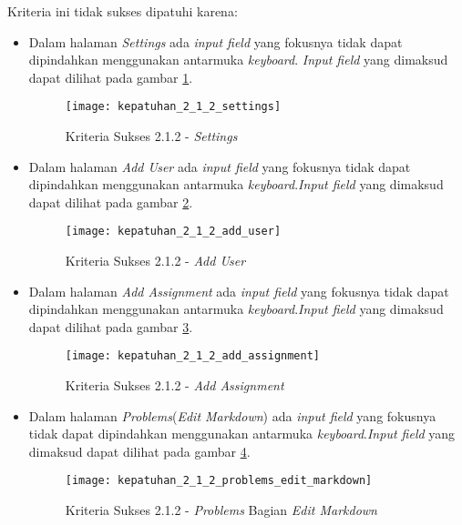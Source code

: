 Kriteria ini tidak sukses dipatuhi karena:
\begin{itemize}
	\item Dalam halaman \textit{Settings} ada \textit{input field} yang fokusnya tidak dapat dipindahkan menggunakan antarmuka \textit{keyboard}. \textit{Input field} yang dimaksud dapat dilihat pada gambar \ref{fig:kepatuhan_2_1_2_settings}.
	\begin{figure}[H]
		\centering  
		\texttt{[image: kepatuhan\_2\_1\_2\_settings]}  
		\caption[Kriteria Sukses 2.1.2 - \textit{Settings}]{Kriteria Sukses 2.1.2 - \textit{Settings}} 
		\label{fig:kepatuhan_2_1_2_settings} 
	\end{figure}

	\item Dalam halaman \textit{Add User} ada \textit{input field} yang fokusnya tidak dapat dipindahkan menggunakan antarmuka \textit{keyboard}.\textit{Input field} yang dimaksud dapat dilihat pada gambar \ref{fig:kepatuhan_2_1_2_add_user}.
	\begin{figure}[H]
		\centering  
		\texttt{[image: kepatuhan\_2\_1\_2\_add\_user]}  
		\caption[Kriteria Sukses 2.1.2 - \textit{Add User}]{Kriteria Sukses 2.1.2 - \textit{Add User}} 
		\label{fig:kepatuhan_2_1_2_add_user} 
	\end{figure}

	\item Dalam halaman \textit{Add Assignment} ada \textit{input field} yang fokusnya tidak dapat dipindahkan menggunakan antarmuka \textit{keyboard}.\textit{Input field} yang dimaksud dapat dilihat pada gambar \ref{fig:kepatuhan_2_1_2_add_assignment}.
	\begin{figure}[H]
		\centering  
		\texttt{[image: kepatuhan\_2\_1\_2\_add\_assignment]}  
		\caption[Kriteria Sukses 2.1.2 - \textit{Add Assignment}]{Kriteria Sukses 2.1.2 - \textit{Add Assignment}} 
		\label{fig:kepatuhan_2_1_2_add_assignment} 
	\end{figure}

	\item Dalam halaman \textit{Problems}(\textit{Edit Markdown}) ada \textit{input field} yang fokusnya tidak dapat dipindahkan menggunakan antarmuka \textit{keyboard}.\textit{Input field} yang dimaksud dapat dilihat pada gambar \ref{fig:kepatuhan_2_1_2_problems_edit_markdown}.
	\begin{figure}[H]
		\centering  
		\texttt{[image: kepatuhan\_2\_1\_2\_problems\_edit\_markdown]}  
		\caption[Kriteria Sukses 2.1.2 - \textit{Problems} Bagian \textit{Edit Markdown}]{Kriteria Sukses 2.1.2 - \textit{Problems} Bagian \textit{Edit Markdown}} 
		\label{fig:kepatuhan_2_1_2_problems_edit_markdown} 
	\end{figure}

\end{itemize}

